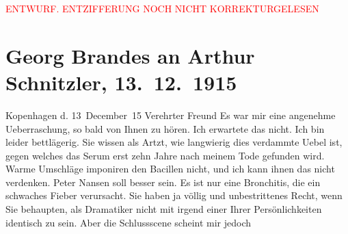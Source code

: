 
\begin{center}
            \textcolor{red}{ENTWURF. ENTZIFFERUNG NOCH NICHT KORREKTURGELESEN}
                      \end{center}
            
               \section[Georg Brandes an Arthur Schnitzler, 13. 12. 1915]{ Georg Brandes an Arthur Schnitzler, 13. 12. 1915}\nopagebreak{}\rehead{ }\begin{ledgroupsized}[t]{13cm}\normalsize\beginnumbering{} \toendnotes[C]{\smallbreak\pagebreak[2]} 
\toendnotes[C]{\smallbreak}\pstart
           \raggedleft{}{\pb}Kopenhagen d. 13 December 15\pend
           \pstart
           Verehrter Freund \hspace*{1.5em}Es war mir eine angenehme Ueberraschung, so bald
               von Ihnen zu hören. Ich erwartete das nicht. Ich bin leider bettlägerig. Sie wissen
               als Artzt, wie langwierig dies verdammte Uebel ist, gegen welches das Serum erst zehn
               Jahre nach meinem Tode gefunden wird. Warme Umschläge imponiren den Bacillen nicht,
               und ich kann ihnen das nicht verdenken.\pend
           \pstart
           Peter Nansen soll besser sein. Es ist nur eine
               Bronchitis, die ein schwaches Fieber verursacht.\pend
           \pstart
           Sie haben ja völlig und unbestrittenes Recht, wenn Sie behaupten, als Dramatiker
               nicht mit irgend einer Ihrer Persönlichkeiten identisch zu sein. Aber die Schlussscene scheint mir jedoch

\end{ledgroupsized}
